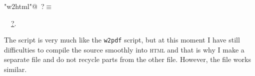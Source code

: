 \documentclass[twoside]{artikel3}
\renewcommand{\NWlink}[2]{\hyperlink{#1}{#2}}
\renewcommand{\NWtarget}[2]{\hypertarget{#1}{#2}}
\renewcommand{\NWsep}{$\diamond$\rule[-1\baselineskip]{0pt}{1\baselineskip}}
\renewcommand{\NWlink}[2]{\hyperlink{#1}{#2}}
\renewcommand{\NWtarget}[2]{\hypertarget{#1}{#2}}
\begin{document}
\begin{flushleft} \small
\begin{minipage}{\linewidth}\label{scrap35}\raggedright\small
\NWtarget{nuweb?}{} \verb@"w2html"@\nobreak\ {\footnotesize {?}}$\equiv$
\vspace{-1ex}
\vspace{-1.5ex}
\footnotesize
\begin{list}{}{\setlength{\itemsep}{-\parsep}\setlength{\itemindent}{-\leftmargin}}
\item \NWtxtIdentsUsed\nobreak\  \verb@nuweb@\nobreak\ \NWlink{nuweb?}{?}.
\item{}
\end{list}
\end{minipage}\vspace{4ex}
\end{flushleft}
The script is very much like the \verb|w2pdf| script, but at this
moment I have still difficulties to compile the source smoothly into
\textsc{html} and that is why I make a separate file and do not
recycle parts from the other file. However, the file works similar.
\end{document}
